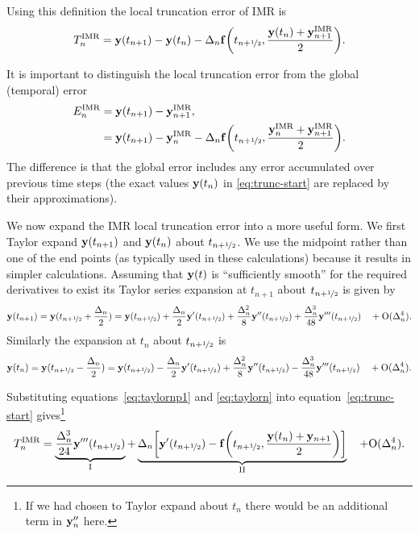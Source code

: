 Using this definition the local truncation error of IMR is
\begin{equation}
  \lte^\imr =  \yv(t_{n+1}) - \yv(t_n) - \dtn \ffv{\thf, \frac{\yv(t_n) + \yv_{n+1}^\imr}{2}}.
  \label{eq:trunc-start}
\end{equation}

It is important to distinguish the local truncation error from the global (temporal) error
\begin{equation}
  \label{eq:global-temporal-error}
  \begin{aligned}
    E_n^\imr &= \yv(t_{n+1}) - \yv_{n+1}^\imr, \\
    &=  \yv(t_{n+1}) - \yv_n^\imr - \dtn \ffv{ \thf, \frac{\yv_n^\imr + \yv_{n+1}^\imr}{2} }.
  \end{aligned}
\end{equation}
The difference is that the global error includes any error accumulated over previous time steps (the exact values $\mathbf{y}(t_n)$ in \eqref{eq:trunc-start} are replaced by their approximations).

We now expand the IMR local truncation error into a more useful form.
We first Taylor expand $\mathbf{y}(t_{n+1})$ and $\mathbf{y}(t_{n})$ about $t_{n+\nicefrac{1}{2}}$.
We use the midpoint rather than one of the end points (as typically used in these calculations) because it results in simpler calculations.
Assuming that $\mathbf{y}(t)$ is ``sufficiently smooth'' for the required derivatives to exist its Taylor series expansion at $t_{n+1}$ about $t_{n+\nicefrac{1}{2}}$ is given by
\begin{equation}
  \yv(t_{n+1}) = \yv(\thf + \frac{\dtn}{2}) = \yvhf + \frac{\dtn}{2} \yvhf['] 
  + \frac{\dtn^2}{8} \yvhf['']
  + \frac{\dtn^3}{48} \yvhf[''']
  \porder{\dtn^4}.
  \label{eq:taylornp1}
\end{equation}
Similarly the expansion at $t_n$ about $t_{n+\nicefrac{1}{2}}$ is
\begin{equation}
  \yv(t_n) = \yv(\thf - \frac{\dtn}{2}) = \yvhf - \frac{\dtn}{2} \yvhf['] 
  + \frac{\dtn^2}{8} \yvhf[''] 
  - \frac{\dtn^3}{48} \yvhf['''] 
  \porder{\dtn^4}.
  \label{eq:taylorn}
\end{equation}

Substituting equations~\eqref{eq:taylornp1} and \eqref{eq:taylorn} into equation~\eqref{eq:trunc-start} gives\footnote{If we had chosen to Taylor expand about $t_n$ there would be an additional term in $\mathbf{y}_n''$ here.}
\begin{equation}
  \lte^\imr = \underbrace{\frac{\dtn^3}{24} \yvhf[''']}_{\text{I}}
  + \underbrace{\dtn\bigs{ \yvhf['] - \ffv{\thf, \frac{\yv(t_n) + \yv_{n+1}}{2}} }}_{\text{II}}
  \porder{\dtn^4}.
  \label{eq:trunc-mid}
\end{equation}

